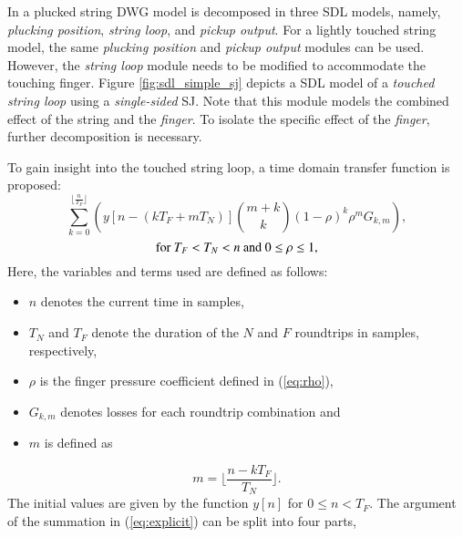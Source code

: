 \documentclass{sigchi}
\begin{document}
In \cite{karjalainen_plucked-string_1998} a plucked string DWG model is decomposed in three SDL models, namely, \textit{plucking position}, \textit{string loop}, and \textit{pickup output}.
For a lightly touched string model, the same \textit{plucking position} and \textit{pickup output} modules can be used.
However, the \textit{string loop} module needs to be modified to accommodate the touching finger.
Figure \ref{fig:sdl_simple_sj} depicts a SDL model of a \textit{touched string loop} using a \textit{single-sided} SJ.
Note that this module models the combined effect of the string and the \textit{finger}.
To isolate the specific effect of the \textit{finger}, further decomposition is necessary.
\begin{figure*}[h]
	\centering
	\scalebox{0.8}{}
	\caption{String loop with a scattering junction.}
	\label{fig:sdl_simple_sj}
\end{figure*}
To gain insight into the touched string loop, a time domain transfer function is proposed:
\begin{equation} \label{eq:explicit}
	\sum_{k=0}^{\lfloor \frac{n}{T_F} \rfloor}\left(y[n - (kT_F + mT_N)]\binom{m+k}{k} (1 - \rho)^{k} \rho^mG_{k,m}\right),
\end{equation}
\begin{equation*}
	\textrm{for } T_F<T_N<n \textrm{ and } 0\leq\rho\leq1\notag,
\end{equation*}
Here, the variables and terms used are defined as follows:
\begin{itemize}
	\setlength\itemsep{0.1em}
	\item $n$ denotes the current time in samples,
	\item $T_N$ and $T_F$ denote the duration of the $N$ and $F$ roundtrips in samples, respectively,
	\item $\rho$ is the finger pressure coefficient defined in (\ref{eq:rho}),
	\item $G_{k,m}$ denotes losses for each roundtrip combination and
	\item $m$ is defined as
\end{itemize}
\begin{equation}
	m = \lfloor \frac{n - kT_F}{T_N} \rfloor.
\end{equation}
The initial values are given by the function $y[n]$ for $0 \leq n < T_F$.
The argument of the summation in (\ref{eq:explicit}) can be split into four parts,
\end{document}
